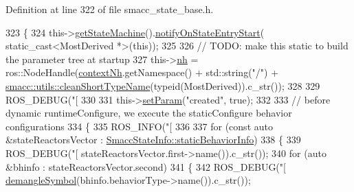 Definition at line 322 of file smacc\+\_\+state\+\_\+base.\+h.


\begin{DoxyCode}
323     \{
324       this->\hyperlink{classsmacc_1_1SmaccState_afc39f8e0ca4001b2159a100da2fccd0e}{getStateMachine}().\hyperlink{classsmacc_1_1ISmaccStateMachine_aeec54e997d715b105ebfeb5caadc4fbf}{notifyOnStateEntryStart}(
      static\_cast<MostDerived *>(\textcolor{keyword}{this}));
325 
326       \textcolor{comment}{// TODO: make this static to build the parameter tree at startup}
327       this->\hyperlink{classsmacc_1_1ISmaccState_a13fe6e6abfdb87996402189d44b78494}{nh} = ros::NodeHandle(\hyperlink{classsmacc_1_1ISmaccState_ae59191a663a08489b7d10036f3b25238}{contextNh}.getNamespace() + std::string(\textcolor{stringliteral}{"/"}) + 
      \hyperlink{namespacesmacc_1_1utils_aacd1975bb7cd9bec4b50e111a2ae7edb}{smacc::utils::cleanShortTypeName}(\textcolor{keyword}{typeid}(MostDerived)).c\_str());
328 
329       ROS\_DEBUG(\textcolor{stringliteral}{"[%
330 
331       this->\hyperlink{classsmacc_1_1ISmaccState_a0b6c531ca8c446052022308548f55b92}{setParam}(\textcolor{stringliteral}{"created"}, \textcolor{keyword}{true});
332 
333       \textcolor{comment}{// before dynamic runtimeConfigure, we execute the staticConfigure behavior configurations}
334       \{
335         ROS\_INFO(\textcolor{stringliteral}{"[%
336 
337         \textcolor{keywordflow}{for} (\textcolor{keyword}{const} \textcolor{keyword}{auto} &stateReactorsVector : 
      \hyperlink{classsmacc_1_1introspection_1_1SmaccStateInfo_ad3d8b3450060cb0b91f38fb2fe0a7678}{SmaccStateInfo::staticBehaviorInfo})
338         \{
339           ROS\_DEBUG(\textcolor{stringliteral}{"[%
      stateReactorsVector.first->name()).c\_str());
340           \textcolor{keywordflow}{for} (\textcolor{keyword}{auto} &bhinfo : stateReactorsVector.second)
341           \{
342             ROS\_DEBUG(\textcolor{stringliteral}{"[%
      \hyperlink{namespacesmacc_1_1introspection_a2f495108db3e57604d8d3ff5ef030302}{demangleSymbol}(bhinfo.behaviorType->name()).c\_str());
}}}}
\end{DoxyCode}
